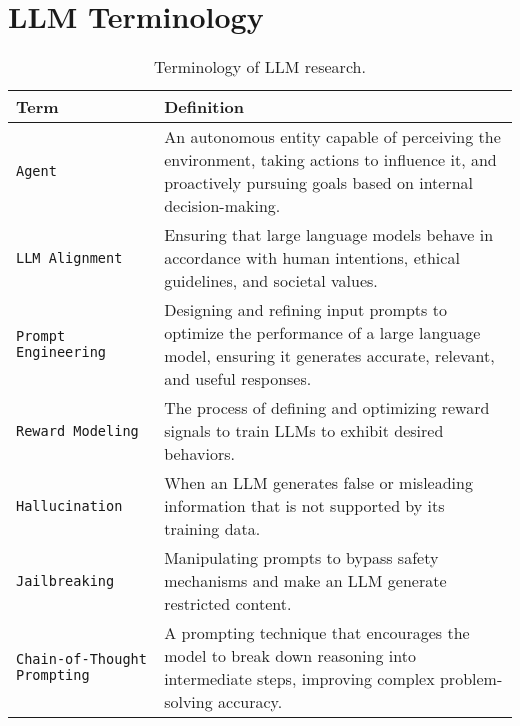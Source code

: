 \newpage
\appendix
\section{LLM Terminology}

\begin{table}[h!]
    \renewcommand{\arraystretch}{1.5} %
    \small %
    \centering
    \label{tab:terminology}
    \begin{tabular}{lp{10cm}} %
        \hline \hline
        \textbf{Term} & \textbf{Definition} \\
        \hline
        \texttt{Agent} & An autonomous entity capable of perceiving the environment, taking actions to influence it, and proactively pursuing goals based on internal decision-making. \\
        \texttt{LLM Alignment} & Ensuring that large language models behave in accordance with human intentions, ethical guidelines, and societal values. \\
        \texttt{Prompt Engineering} & Designing and refining input prompts to optimize the performance of a large language model, ensuring it generates accurate, relevant, and useful responses. \\
        \texttt{Reward Modeling} & The process of defining and optimizing reward signals to train LLMs to exhibit desired behaviors. \\
        \texttt{Hallucination} & When an LLM generates false or misleading information that is not supported by its training data. \\
        \texttt{Jailbreaking} & Manipulating prompts to bypass safety mechanisms and make an LLM generate restricted content. \\
        \texttt{Chain-of-Thought Prompting} & A prompting technique that encourages the model to break down reasoning into intermediate steps, improving complex problem-solving accuracy. \\
        \hline \hline
    \end{tabular}
    \caption{Terminology of LLM research.} %
\end{table}


